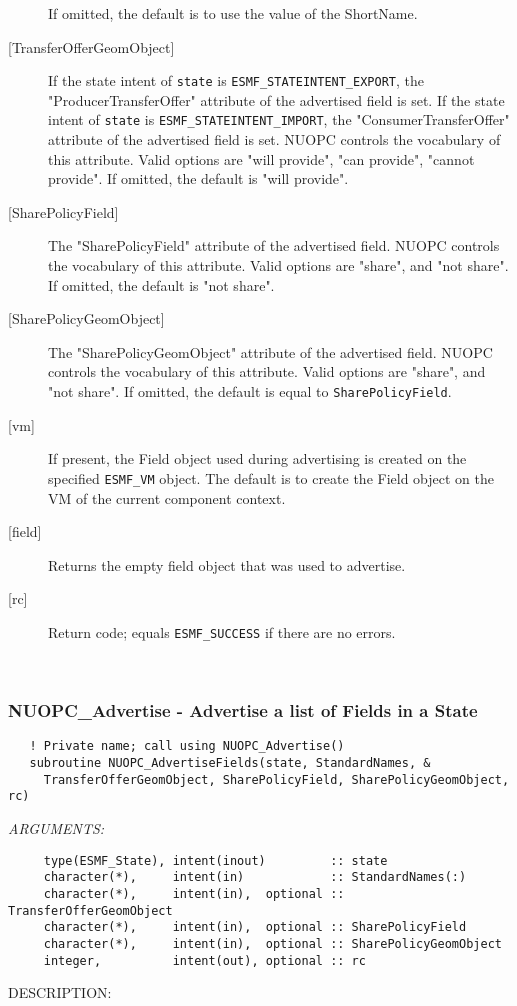 \begin{description}
       If omitted, the default is to use the value of the ShortName.
     \item[{[TransferOfferGeomObject]}]
       If the state intent of {\tt state} is {\tt ESMF\_STATEINTENT\_EXPORT},
       the "ProducerTransferOffer" attribute of the advertised field is set.
       If the state intent of {\tt state} is {\tt ESMF\_STATEINTENT\_IMPORT},
       the "ConsumerTransferOffer" attribute of the advertised field is set.
       NUOPC controls the vocabulary of this attribute. Valid options are 
       "will provide", "can provide", "cannot provide".
       If omitted, the default is "will provide".
     \item[{[SharePolicyField]}]
       The "SharePolicyField" attribute of the advertised field. NUOPC 
       controls the vocabulary of this attribute. Valid options are 
       "share", and "not share".
       If omitted, the default is "not share".
     \item[{[SharePolicyGeomObject]}]
       The "SharePolicyGeomObject" attribute of the advertised field. NUOPC 
       controls the vocabulary of this attribute. Valid options are 
       "share", and "not share".
       If omitted, the default is equal to {\tt SharePolicyField}.
     \item[{[vm]}]
       If present, the Field object used during advertising is created on the
       specified {\tt ESMF\_VM} object. The default is to create the Field object
       on the VM of the current component context.
     \item[{[field]}]
       Returns the empty field object that was used to advertise.
     \item[{[rc]}]
       Return code; equals {\tt ESMF\_SUCCESS} if there are no errors.
     \end{description}
   
 
\mbox{}\hrulefill\ 
 
\subsubsection [NUOPC\_Advertise] {NUOPC\_Advertise - Advertise a list of Fields in a State}


\begin{verbatim}   ! Private name; call using NUOPC_Advertise() 
   subroutine NUOPC_AdvertiseFields(state, StandardNames, &
     TransferOfferGeomObject, SharePolicyField, SharePolicyGeomObject, rc)\end{verbatim}{\em ARGUMENTS:}
\begin{verbatim}     type(ESMF_State), intent(inout)         :: state
     character(*),     intent(in)            :: StandardNames(:)
     character(*),     intent(in),  optional :: TransferOfferGeomObject
     character(*),     intent(in),  optional :: SharePolicyField
     character(*),     intent(in),  optional :: SharePolicyGeomObject
     integer,          intent(out), optional :: rc\end{verbatim}
{\sf DESCRIPTION:\\ }


